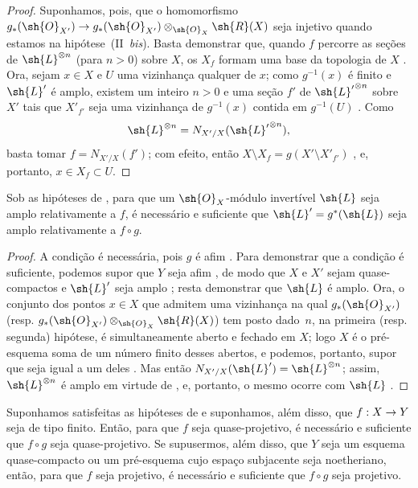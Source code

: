 \documentclass[oneside,10pt]{amsart}
\makeatletter
\newcommand{\ega@arrow}[2]{\mathchoice{#1}{#2}{#2}{#2}}
\renewcommand{\to}{\ega@arrow{\longrightarrow}{\rightarrow}}
\newcommand{\oldpage}[2][]{\marginnote{\normalfont\footnotesize\textbf{#1}~|~#2}\ignorespaces}
\let\EGAOriginalLabel\label
\renewcommand{\label}[1]{\phantomsection\EGAOriginalLabel{#1}}
\makeatother
\begin{document}
\begin{proof}
Suponhamos, pois, que o homomorfismo $g_*(\sh{O}_{X'})\to g_*(\sh{O}_{X'})\otimes_{\sh{O}_X}\sh{R}(X)$ seja injetivo quando estamos na hipótese~(II~\emph{bis}).
Basta demonstrar que, quando $f$ percorre as seções de $\sh{L}^{\otimes n}$ (para $n>0$) sobre $X$, os $X_f$ formam uma base da topologia de $X$ .
Ora, sejam $x\in X$ e $U$ uma vizinhança qualquer de $x$;
como $g^{-1}(x)$ é finito  e $\sh{L}'$ é amplo, existem um inteiro $n>0$ e uma seção $f'$ de ${\sh{L}'}^{\otimes n}$ sobre $X'$ tais que $X'_{f'}$ seja uma vizinhança de $g^{-1}(x)$ contida em $g^{-1}(U)$ .
Como
\[
  \sh{L}^{\otimes n} = N_{X'/X}({\sh{L}'}^{\otimes n}),
\]
basta tomar $f=N_{X'/X}(f')$;
com efeito, então $X\setminus X_f=g(X'\setminus X'_{f'})$ , e, portanto, $x\in X_f\subset U$.
\end{proof}

\begin{corollary}[6.6.3]
\label{II.6.6.3}
Sob as hipóteses de , para que um $\sh{O}_X$-módulo invertível $\sh{L}$ seja amplo relativamente a $f$, é necessário e suficiente que $\sh{L}'=g^*(\sh{L})$ seja amplo relativamente a $f\circ g$.
\end{corollary}

\begin{proof}
A condição é necessária, pois $g$ é afim .
Para demonstrar que a condição é suficiente, podemos supor que $Y$ seja afim , de modo que $X$ e $X'$ sejam quase-compactos e $\sh{L}'$ seja amplo ; resta demonstrar que $\sh{L}$ é amplo. Ora, o conjunto dos pontos
\oldpage[II]{132}
$x\in X$ que admitem uma vizinhança na qual $g_*(\sh{O}_{X'})$ (resp. $g_*(\sh{O}_{X'})\otimes_{\sh{O}_X}\sh{R}(X)$) tem posto dado~$n$, na primeira (resp. segunda) hipótese, é simultaneamente aberto e fechado em $X$; logo $X$ é o pré-esquema soma de um número finito desses abertos, e podemos, portanto, supor que seja igual a um deles .
Mas então $N_{X'/X}(\sh{L}')=\sh{L}^{\otimes n}$; assim, $\sh{L}^{\otimes n}$ é amplo em virtude de , e, portanto, o mesmo ocorre com $\sh{L}$ .
\end{proof}

\begin{corollary}[6.6.4]
\label{II.6.6.4}
Suponhamos satisfeitas as hipóteses de  e suponhamos, além disso, que $f:X\to Y$ seja de tipo finito.
Então, para que $f$ seja quase-projetivo, é necessário e suficiente que $f\circ g$ seja quase-projetivo.
Se supusermos, além disso, que $Y$ seja um esquema quase-compacto ou um pré-esquema cujo espaço subjacente seja noetheriano, então, para que $f$ seja projetivo, é necessário e suficiente que $f\circ g$ seja projetivo.
\end{corollary}
\end{document}
